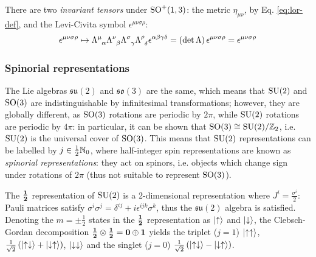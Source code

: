 There are two \textit{invariant tensors} under $ \mathrm{SO}^+(1,3) $: the metric $ \eta_{\mu \nu} $, by Eq. \ref{eq:lor-def}, and the Levi-Civita symbol $ \epsilon^{\mu \nu \sigma \rho} $:
\begin{equation*}
  \epsilon^{\mu \nu \sigma \rho} \mapsto \tensor{\Lambda}{^\mu_\alpha} \tensor{\Lambda}{^\nu_\beta} \tensor{\Lambda}{^\sigma_\gamma} \tensor{\Lambda}{^\rho_\delta} \epsilon^{\alpha \beta \gamma \delta} = \left( \det \Lambda \right) \epsilon^{\mu \nu \sigma \rho} = \epsilon^{\mu \nu \sigma \rho}
\end{equation*}

\subsubsection{Spinorial representations}

The Lie algebras $ \mathfrak{su}(2) $ and $ \mathfrak{so}(3) $ are the same, which means that $ \mathrm{SU}(2) $ and $ \mathrm{SO}(3) $ are indistinguishable by infinitesimal transformations; however, they are globally different, as $ \mathrm{SO}(3) $ rotations are periodic by $ 2\pi $, while $ \mathrm{SU}(2) $ rotations are periodic by $ 4\pi $: in particular, it can be shown that $ \mathrm{SO}(3) \cong \mathrm{SU}(2) / \mathbb{Z}_2 $, i.e. $ \mathrm{SU}(2) $ is the universal cover of $ \mathrm{SO}(3) $. This means that $ \mathrm{SU}(2) $ representations can be labelled by $ j \in \frac{1}{2} \mathbb{N}_0 $, where half-integer spin representations are known as \textit{spinorial representations}: they act on spinors, i.e. objects which change sign under rotations of $ 2\pi $ (thus not suitable to represent $ \mathrm{SO}(3) $).

\begin{example}{}{}
  The $ \mathbf{\frac{1}{2}} $ representation of $ \mathrm{SU}(2) $ is a 2-dimensional representation where $ J^i = \frac{\sigma^i}{2} $: Pauli matrices satisfy $ \sigma^i \sigma^j = \delta^{ij} + i \epsilon^{ijk} \sigma^k $, thus the $ \mathfrak{su}(2) $ algebra is satisfied. Denoting the $ m = \pm \frac{1}{2} $ states in the $ \mathbf{\frac{1}{2}} $ representation as $ \ket{\uparrow} $ and $ \ket{\downarrow} $, the Clebsch-Gordan decomposition $ \mathbf{\frac{1}{2}} \otimes \mathbf{\frac{1}{2}} = \mathbf{0} \oplus \mathbf{1} $ yields the triplet ($ j = 1 $) $ \ket{\uparrow\uparrow} $, $ \frac{1}{\sqrt{2}}\left( \ket{\uparrow\downarrow} + \ket{\downarrow\uparrow} \right) $, $ \ket{\downarrow\downarrow} $ and the singlet ($ j = 0 $) $ \frac{1}{\sqrt{2}}\left( \ket{\uparrow\downarrow} - \ket{\downarrow\uparrow} \right) $.
\end{example}

